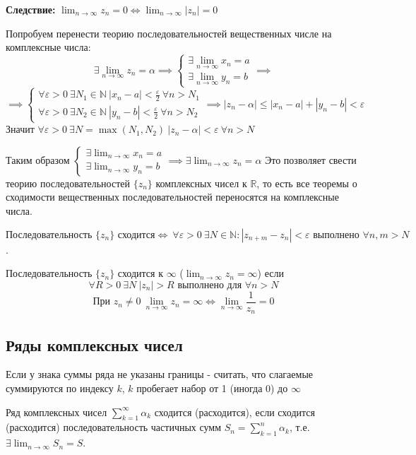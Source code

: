 \textbf{Следствие:} $\lim_{n \to \infty} z_n = 0 \iff \lim_{n \to \infty} \left| z_n \right| = 0$
        
    
Попробуем перенести теорию последовательностей вещественных числе на комплексные числа:
\[\exists \lim_{n \to \infty} z_n = \alpha \implies \begin{cases}
    \exists \lim_{n \to \infty} x_n = a \\
    \exists \lim_{n \to \infty} y_n = b
\end{cases} \implies \] 
\[ \implies \begin{cases}
    \forall \varepsilon > 0 \ \exists N_1 \in \mathbb{N} \ \left| x_n - a \right| < \frac{\varepsilon}{2} \ \forall n > N_1 \\
    \forall \varepsilon > 0 \ \exists N_2 \in \mathbb{N} \ \left| y_n - b \right| < \frac{\varepsilon}{2} \ \forall n > N_2 
\end{cases} \implies \left| z_n - \alpha\right| \leq \left| x_n - a \right| + \left| y_n - b\right| < \varepsilon\]
Значит $\forall \varepsilon > 0 \ \exists N = \max(N_1, N_2) \ \left|z_n - \alpha\right| < \varepsilon \ \forall n > N$

Таким образом $\begin{cases}
    \exists \lim_{n \to \infty} x_n = a \\
    \exists \lim_{n \to \infty} y_n = b
\end{cases}  \implies \exists \lim_{n \to \infty} z_n = \alpha$
Это позволяет свести теорию последовательностей $\{z_n\}$ комплексных чисел к $\mathbb{R}$, 
то есть все теоремы о сходимости вещественных последовательностей переносятся на комплексные числа.

\begin{theorem*}
    \[\text{Последовательность } \{z_n\} \text{ сходится} \iff \ \forall\varepsilon > 0 \ \exists N \in \mathbb{N}: \left| z_{n+m} - z_n \right|< \varepsilon  \text{ выполнено } \forall n, m > N\].
\end{theorem*}

\begin{definition}
    Последовательность $\{z_n\}$ сходится к $\infty$ ($\lim_{n \to \infty} z_n = \infty$) если
    \[\forall R > 0 \ \exists N \ \left| z_n \right| > R \text{ выполнено для } \forall n > N\]
    \[\text{При } z_n \neq 0 \ \lim_{n \to \infty}z_n = \infty \iff \lim_{n \to \infty} \frac{1}{z_n} = 0\]
\end{definition}

\newpage
\subsection{Ряды комплексных чисел}
Если у знака суммы ряда не указаны границы - считать, что слагаемые суммируются по индексу $k$, $k$ пробегает набор от 1 (иногда 0) до $\infty$
\begin{definition}
    Ряд комплексных чисел $\sum_{k=1}^{\infty}\alpha_k$ сходится (расходится), если сходится (расходится) последовательность частичных сумм $S_n = \sum_{k=1}^{n}\alpha_k$, т.е. $\exists \lim_{n \to \infty} S_n = S$.
\end{definition}

